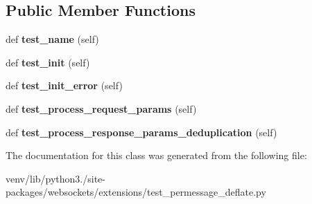\subsection*{Public Member Functions}
\begin{DoxyCompactItemize}
\item 
\mbox{\label{classwebsockets_1_1extensions_1_1test__permessage__deflate_1_1_server_per_message_deflate_factory_tests_ac0348f3e38662025f168d11e56274dea}} 
def {\bfseries test\+\_\+name} (self)
\item 
\mbox{\label{classwebsockets_1_1extensions_1_1test__permessage__deflate_1_1_server_per_message_deflate_factory_tests_ae07234af327187aae86477d0f938a9b6}} 
def {\bfseries test\+\_\+init} (self)
\item 
\mbox{\label{classwebsockets_1_1extensions_1_1test__permessage__deflate_1_1_server_per_message_deflate_factory_tests_adca8d8398bffa4839095d1c49a840731}} 
def {\bfseries test\+\_\+init\+\_\+error} (self)
\item 
\mbox{\label{classwebsockets_1_1extensions_1_1test__permessage__deflate_1_1_server_per_message_deflate_factory_tests_a302dd2820ff902fefe95a78c3d211440}} 
def {\bfseries test\+\_\+process\+\_\+request\+\_\+params} (self)
\item 
\mbox{\label{classwebsockets_1_1extensions_1_1test__permessage__deflate_1_1_server_per_message_deflate_factory_tests_afb3bb1127569ddec1bc203373dc0157c}} 
def {\bfseries test\+\_\+process\+\_\+response\+\_\+params\+\_\+deduplication} (self)
\end{DoxyCompactItemize}


The documentation for this class was generated from the following file\+:\begin{DoxyCompactItemize}
\item 
venv/lib/python3./site-\/packages/websockets/extensions/test\+\_\+permessage\+\_\+deflate.\+py\end{DoxyCompactItemize}
